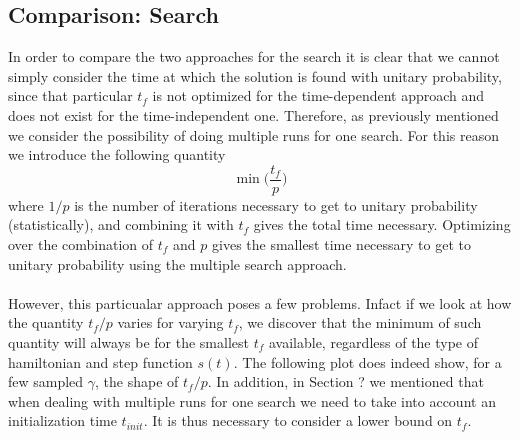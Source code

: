     \subsection{Comparison: Search}
        In order to compare the two approaches for the search it is clear that we cannot simply consider the time at which the solution is found with unitary probability, since that particular $t_f$ is not optimized for the time-dependent approach and does not exist for the time-independent one. Therefore, as previously mentioned we consider the possibility of doing multiple runs for one search. For this reason we introduce the following quantity
        \begin{equation}
          \min\Big(\frac{t_f}{p}\Big)
        \end{equation}
        where $1/p$ is the number of iterations necessary to get to unitary probability (statistically), and combining it with $t_f$ gives the total time necessary. Optimizing over the combination of $t_f$ and $p$ gives the smallest time necessary to get to unitary probability using the multiple search approach.\\ \\  However, this particualar approach poses a few problems. Infact if we look at how the quantity $t_f/p$ varies for varying $t_f$, we discover that the minimum of such quantity will always be for the smallest $t_f$ available, regardless of the type of hamiltonian and step function $s(t)$. The following plot does indeed show, for a few sampled $\gamma$, the shape of $t_f/p$. In addition, in Section ? we mentioned that when dealing with multiple runs for one search we need to take into account an initialization time $t_{init}$. It is thus necessary to consider a lower bound on $t_f$.
